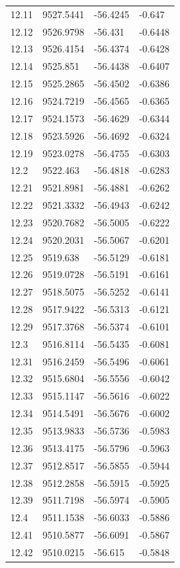 \begin{table}[H]
\begin{tabular}{llll}
12.11 & 9527.5441 & -56.4245 & -0.647 \\
12.12 & 9526.9798 & -56.431 & -0.6448 \\
12.13 & 9526.4154 & -56.4374 & -0.6428 \\
12.14 & 9525.851 & -56.4438 & -0.6407 \\
12.15 & 9525.2865 & -56.4502 & -0.6386 \\
12.16 & 9524.7219 & -56.4565 & -0.6365 \\
12.17 & 9524.1573 & -56.4629 & -0.6344 \\
12.18 & 9523.5926 & -56.4692 & -0.6324 \\
12.19 & 9523.0278 & -56.4755 & -0.6303 \\
12.2 & 9522.463 & -56.4818 & -0.6283 \\
12.21 & 9521.8981 & -56.4881 & -0.6262 \\
12.22 & 9521.3332 & -56.4943 & -0.6242 \\
12.23 & 9520.7682 & -56.5005 & -0.6222 \\
12.24 & 9520.2031 & -56.5067 & -0.6201 \\
12.25 & 9519.638 & -56.5129 & -0.6181 \\
12.26 & 9519.0728 & -56.5191 & -0.6161 \\
12.27 & 9518.5075 & -56.5252 & -0.6141 \\
12.28 & 9517.9422 & -56.5313 & -0.6121 \\
12.29 & 9517.3768 & -56.5374 & -0.6101 \\
12.3 & 9516.8114 & -56.5435 & -0.6081 \\
12.31 & 9516.2459 & -56.5496 & -0.6061 \\
12.32 & 9515.6804 & -56.5556 & -0.6042 \\
12.33 & 9515.1147 & -56.5616 & -0.6022 \\
12.34 & 9514.5491 & -56.5676 & -0.6002 \\
12.35 & 9513.9833 & -56.5736 & -0.5983 \\
12.36 & 9513.4175 & -56.5796 & -0.5963 \\
12.37 & 9512.8517 & -56.5855 & -0.5944 \\
12.38 & 9512.2858 & -56.5915 & -0.5925 \\
12.39 & 9511.7198 & -56.5974 & -0.5905 \\
12.4 & 9511.1538 & -56.6033 & -0.5886 \\
12.41 & 9510.5877 & -56.6091 & -0.5867 \\
12.42 & 9510.0215 & -56.615 & -0.5848 \\

\end{tabular}
\end{table}
